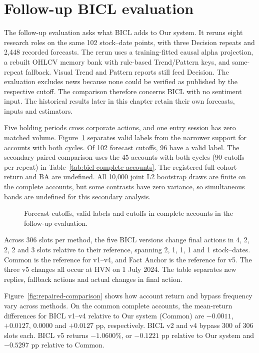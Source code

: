 \section{Follow-up BICL evaluation}\label{sec:bicl-followup}

The follow-up evaluation asks what BICL adds to Our system. It reruns eight
research roles on the same 102 stock--date points, with three Decision
repeats and 2,448 recorded forecasts. The rerun uses a training-fitted
causal alpha projection, a rebuilt OHLCV memory bank with rule-based Trend/Pattern keys, and
same-repeat fallback. Visual Trend and Pattern reports still feed Decision. The evaluation excludes news because none could be verified as
published by the respective cutoff. The comparison therefore concerns
BICL with no sentiment input. The historical results later in this chapter
retain their own forecasts, inputs and estimators.

Five holding periods cross corporate actions, and one entry session has
zero matched volume. Figure~\ref{fig:repaired-coverage} separates valid
labels from the narrower support for accounts with both cycles.
Of 102 forecast cutoffs, 96 have a valid label. The secondary paired
comparison uses the 45 accounts with both cycles (90 cutoffs per repeat)
in Table~\ref{tab:bicl-complete-accounts}. The registered full-cohort
return and BA are undefined. All 10,000 joint L2 bootstrap draws are finite
on the complete accounts, but some contrasts have zero variance, so
simultaneous bands are undefined for this secondary analysis.
\begin{figure}[!htb]\centering

\caption[Follow-up sample coverage]{Forecast cutoffs, valid labels and cutoffs in complete accounts in the follow-up evaluation.}\label{fig:repaired-coverage}
\end{figure}


Across 306 slots per method, the five BICL versions change final actions
in 4, 2, 2, 2 and 3 slots relative to their reference, spanning 2, 1, 1,
1 and 1 stock--dates. Common is the reference for v1--v4, and Fact Anchor
is the reference for v5. The three v5 changes all occur at HVN on
1 July 2024. The table separates new replies, fallback actions and
actual changes in final action.

Figure~\ref{fig:repaired-comparison} shows how account return and bypass
frequency vary across methods. On the common complete accounts, the mean-return differences for
BICL v1--v4 relative to Our system (Common) are $-0.0011$, $+0.0127$,
$0.0000$ and $+0.0127$ pp, respectively. BICL v2 and v4 bypass 300 of 306
slots each. BICL v5 returns $-1.0600$\%, or $-0.1221$ pp relative to Our
system and $-0.5297$ pp relative to Common.

